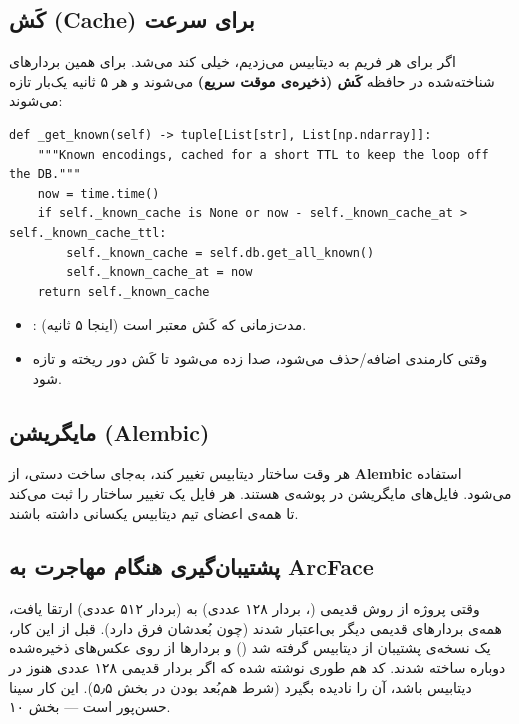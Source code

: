 \documentclass[12pt,a4paper]{article}
\begin{document}
\subsection{کَش (Cache) برای سرعت}
اگر برای هر فریم به دیتابیس می‌زدیم، خیلی کند می‌شد. برای همین بردارهای شناخته‌شده در حافظه \textbf{کَش (ذخیره‌ی موقت سریع)} می‌شوند و هر ۵ ثانیه یک‌بار تازه می‌شوند:

\begin{latin}
\begin{lstlisting}
def _get_known(self) -> tuple[List[str], List[np.ndarray]]:
    """Known encodings, cached for a short TTL to keep the loop off the DB."""
    now = time.time()
    if self._known_cache is None or now - self._known_cache_at > self._known_cache_ttl:
        self._known_cache = self.db.get_all_known()
        self._known_cache_at = now
    return self._known_cache
\end{lstlisting}
\end{latin}
\begin{itemize}[rightmargin=0pt]
  \item {}: مدت‌زمانی که کَش معتبر است (اینجا ۵ ثانیه).
  \item وقتی کارمندی اضافه/حذف می‌شود،  صدا زده می‌شود تا کَش دور ریخته و تازه شود.
\end{itemize}

\subsection{مایگریشن (Alembic)}
هر وقت ساختار دیتابیس تغییر کند، به‌جای ساخت دستی، از \textbf{Alembic} استفاده می‌شود. فایل‌های مایگریشن در پوشه‌ی  هستند. هر فایل یک تغییر ساختار را ثبت می‌کند تا همه‌ی اعضای تیم دیتابیس یکسانی داشته باشند.

\subsection{پشتیبان‌گیری هنگام مهاجرت به ArcFace}
وقتی پروژه از روش قدیمی (، بردار ۱۲۸ عددی) به  (بردار ۵۱۲ عددی) ارتقا یافت، همه‌ی بردارهای قدیمی دیگر بی‌اعتبار شدند (چون بُعدشان فرق دارد). قبل از این کار، یک نسخه‌ی پشتیبان از دیتابیس گرفته شد () و بردارها از روی عکس‌های ذخیره‌شده دوباره ساخته شدند. کد هم طوری نوشته شده که اگر بردار قدیمی ۱۲۸ عددی هنوز در دیتابیس باشد، آن را نادیده بگیرد (شرط هم‌بُعد بودن در بخش ۵٫۵). این کار سینا حسن‌پور است — بخش ۱۰.
\end{document}
